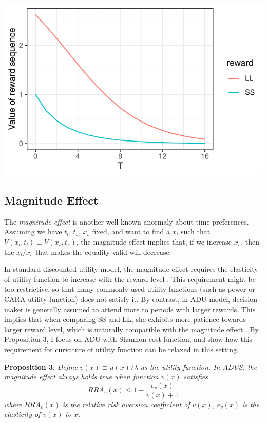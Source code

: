 \documentclass[
  12pt,
]{article}
\begin{document}
\includegraphics{images/value_LLvSS.pdf}

\hypertarget{magnitude-effect}{%
\subsection{Magnitude Effect}\label{magnitude-effect}}

The \emph{magnitude effect} is another well-known anormaly about time
preferences. Assuming we have \(t_l\), \(t_s\), \(x_s\) fixed, and want
to find a \(x_l\) such that \(V(x_l,t_l) \equiv V(x_s,t_s)\), the
magnitude effect implies that, if we increase \(x_s\), then the
\(x_l/x_s\) that makes the equality valid will decrease.

In standard discounted utility model, the magnitude effect requires the
elasticity of utility function to increase with the reward level
\citep{loewenstein_anomalies_1992}. This requirement might be too
restrictive, so that many commonly used utility functions (such as power
or CARA utility function) does not satisfy it. By contrast, in ADU
model, decision maker is generally assumed to attend more to periods
with larger rewards. This implies that when comparing SS and LL, she
exhibits more patience towards larger reward level, which is naturally
compatible with the magnitude effect
\citep{noor_intertemporal_2011, noor_optimal_2022}. By Proposition 3, I
focus on ADU with Shannon cost function, and show how this requirement
for curvature of utility function can be relaxed in this setting.

\textbf{Proposition 3}: \emph{Define} \(v(x)\equiv u(x)/\lambda\)
\emph{as the utility function. In ADUS, the magnitude effect always
holds true when function} \(v(x)\) \emph{satisfies}\[
RRA_v(x)\leq 1-\frac{e_v(x)}{v(x)+1}
\]\emph{where} \(RRA_v(x)\) \emph{is the relative risk aversion
coefficient of} \(v(x)\)\emph{,} \(e_v(x)\) \emph{is the elasticity of}
\(v(x)\) \emph{to} \(x\)\emph{.}
\end{document}
